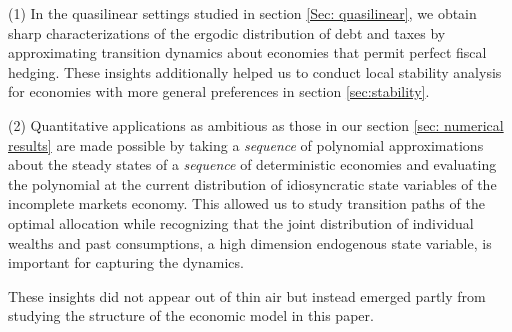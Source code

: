 \documentclass[thmsb,11pt]{article}
\begin{document}
(1) In the quasilinear settings studied in section \ref{Sec: quasilinear}, we obtain sharp characterizations of the ergodic distribution of debt and taxes by  
approximating transition dynamics about economies that permit perfect fiscal hedging. These insights additionally helped us to conduct local stability analysis for economies with more general preferences in section \ref{sec:stability}.

(2) Quantitative applications as ambitious as those in our section \ref{sec: numerical results} are made possible  by taking a {\em sequence } of polynomial approximations about the steady states of a {\em sequence } of  deterministic economies and evaluating the polynomial at the current distribution  of idiosyncratic state variables of the incomplete markets economy. This allowed us to study transition paths of the optimal allocation while recognizing that the joint distribution of individual wealths and past consumptions, a high dimension endogenous state variable, is important for capturing the dynamics. 

These insights did not appear out of thin air but instead emerged partly from studying the structure of the economic model in this paper.



\end{document}
